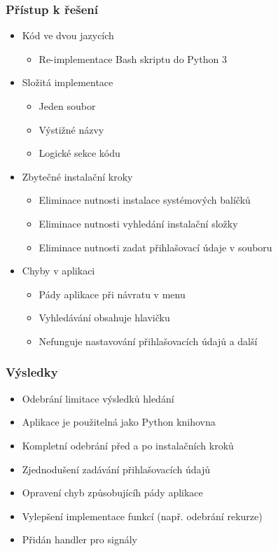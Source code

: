 \documentclass[%
  12pt,       				%
	t,                  %
	aspectratio=1610,   %
	unicode,						%
]{beamer}				    	%
\begin{document}
\begin{frame} 
\frametitle{Přístup k řešení}
\begin{itemize}
	\item Kód ve dvou jazycích
		\begin{itemize}
			\item Re-implementace Bash skriptu do Python 3
		\end{itemize}
	\item Složitá implementace
		\begin{itemize}
			\item Jeden soubor
			\item Výstižné názvy
			\item Logické sekce kódu
		\end{itemize}
	\item Zbytečné instalační kroky
		\begin{itemize}
			\item Eliminace nutnosti instalace systémových balíčků
			\item Eliminace nutnosti vyhledání instalační složky
			\item Eliminace nutnosti zadat přihlašovací údaje v souboru
		\end{itemize}
	\item Chyby v aplikaci
		\begin{itemize}
			\item Pády aplikace při návratu v menu
			\item Vyhledávání obsahuje hlavičku
			\item Nefunguje nastavování přihlašovacích údajů a další
		\end{itemize}
\end{itemize}
\end{frame} 

\begin{frame} 
\frametitle{Výsledky}
\begin{itemize}
	\item Odebrání limitace výsledků hledání
	\item Aplikace je použitelná jako Python knihovna
	\item Kompletní odebrání před a po instalačních kroků
	\item Zjednodušení zadávání přihlašovacích údajů
	\item Opravení chyb způsobujícíh pády aplikace
	\item Vylepšení implementace funkcí (např. odebrání rekurze)
	\item Přidán handler pro signály
\end{itemize}
\end{frame} 
\end{document}
